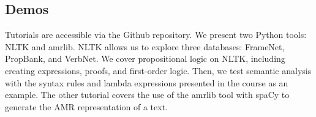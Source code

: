 \documentclass{KBook}
\begin{document}
\subsection*{Demos}

Tutorials are accessible via the Github repository. We present two Python tools: NLTK and amrlib.
NLTK allows us to explore three databases: FrameNet, PropBank, and VerbNet.
We cover propositional logic on NLTK, including creating expressions, proofs, and first-order logic.
Then, we test semantic analysis with the syntax rules and lambda expressions presented in the course as an example.
The other tutorial covers the use of the amrlib tool with spaCy to generate the AMR representation of a text.




\ifx\wholebook\relax\else
% 
% 
	
\end{document}
